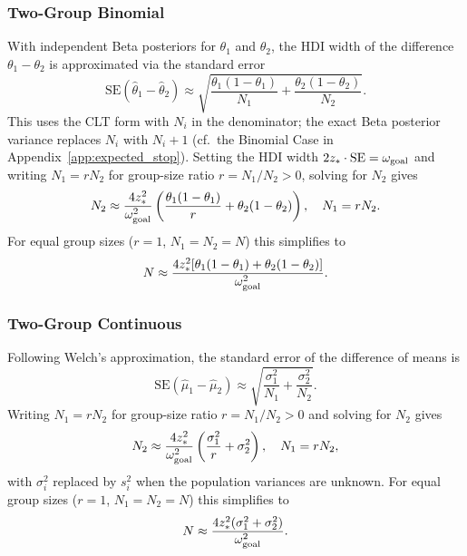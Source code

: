 \subsubsection*{Two-Group Binomial}

With independent Beta posteriors for $\theta_1$ and $\theta_2$, the HDI width of
the difference $\theta_1 - \theta_2$ is approximated via the standard error
\begin{equation}\label{eq:se_diff_binomial}
    \text{SE}(\hat\theta_1 - \hat\theta_2) \approx
    \sqrt{\frac{\theta_1(1-\theta_1)}{N_1} + \frac{\theta_2(1-\theta_2)}{N_2}}.
\end{equation}
This uses the CLT form with $N_i$ in the denominator; the exact Beta posterior
variance replaces $N_i$ with $N_i+1$ (cf.\ the Binomial Case in
Appendix~\ref{app:expected_stop}).
Setting the HDI width $2z_* \cdot \text{SE} = \omega_{\rm goal}$ and writing
$N_1 = rN_2$ for group-size ratio $r = N_1/N_2 > 0$, solving for $N_2$ gives
\begin{equation}\label{eq:ngoal_two_group_binomial}
    N_2 \approx \frac{4 z_{*}^{2}}{\omega_{\rm goal}^{2}}
        \left(\frac{\theta_1(1-\theta_1)}{r} + \theta_2(1-\theta_2)\right),
    \quad N_1 = r N_2.
\end{equation}
For equal group sizes ($r=1$, $N_1=N_2=N$) this simplifies to
\begin{equation}\label{eq:ngoal_two_group_binomial_equal}
    N \approx \frac{4 z_{*}^{2}[\theta_1(1-\theta_1)+\theta_2(1-\theta_2)]}{\omega_{\rm goal}^{2}}.
\end{equation}

\subsubsection*{Two-Group Continuous}

Following Welch's approximation, the standard error of the difference of means is
\begin{equation}\label{eq:se_diff_continuous}
    \text{SE}(\hat\mu_1 - \hat\mu_2) \approx
    \sqrt{\frac{\sigma_1^2}{N_1} + \frac{\sigma_2^2}{N_2}}.
\end{equation}
Writing $N_1 = rN_2$ for group-size ratio $r = N_1/N_2 > 0$ and solving for $N_2$ gives
\begin{equation}\label{eq:ngoal_two_group_continuous}
    N_2 \approx \frac{4 z_{*}^{2}}{\omega_{\rm goal}^{2}}
        \left(\frac{\sigma_1^2}{r} + \sigma_2^2\right),
    \quad N_1 = r N_2,
\end{equation}
with $\sigma_i^2$ replaced by $s_i^2$ when the population variances are unknown.
For equal group sizes ($r=1$, $N_1=N_2=N$) this simplifies to
\begin{equation}\label{eq:ngoal_two_group_continuous_equal}
    N \approx \frac{4 z_{*}^{2}(\sigma_1^2+\sigma_2^2)}{\omega_{\rm goal}^{2}}.
\end{equation}
